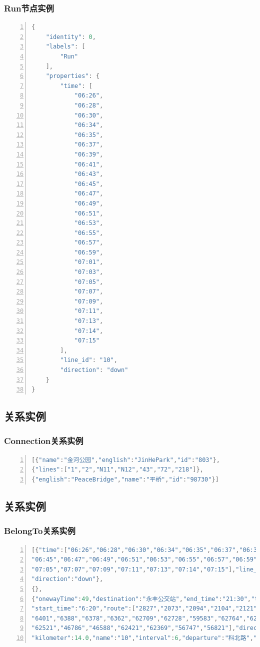 \documentclass[11pt,a4paper]{article}
\begin{document}
\subsubsection{Run节点实例}
\begin{lstlisting}[numbers = left, 
showspaces = false,
breaklines = true, 
language=Java]
{
	"identity": 0,
	"labels": [
		"Run"
	],
	"properties": {
		"time": [
			"06:26",
			"06:28",
			"06:30",
			"06:34",
			"06:35",
			"06:37",
			"06:39",
			"06:41",
			"06:43",
			"06:45",
			"06:47",
			"06:49",
			"06:51",
			"06:53",
			"06:55",
			"06:57",
			"06:59",
			"07:01",
			"07:03",
			"07:05",
			"07:07",
			"07:09",
			"07:11",
			"07:13",
			"07:14",
			"07:15"
		],
		"line_id": "10",
		"direction": "down"
	} 
}
\end{lstlisting} 

\subsection{关系实例}
\subsubsection{Connection关系实例}
\begin{lstlisting}[numbers = left, 
showspaces = false,
breaklines = true, 
language=Java]
[{"name":"金河公园","english":"JinHePark","id":"803"}, 
{"lines":["1","2","N11","N12","43","72","218"]}, 
{"english":"PeaceBridge","name":"平桥","id":"98730"}]
\end{lstlisting} 

\subsection{关系实例}
\subsubsection{BelongTo关系实例}
\begin{lstlisting}[numbers = left, 
showspaces = false,
breaklines = true, 
language=Java]
[{"time":["06:26","06:28","06:30","06:34","06:35","06:37","06:39","06:41","06:43",
"06:45","06:47","06:49","06:51","06:53","06:55","06:57","06:59","07:01","07:03",
"07:05","07:07","07:09","07:11","07:13","07:14","07:15"],"line_id":"10",
"direction":"down"},
{},
{"onewayTime":49,"destination":"永丰公交站","end_time":"21:30","type":"干线",
"start_time":"6:20","route":["2827","2073","2094","2104","2121","2229","3639","6408",
"6401","6388","6378","6362","62709","62728","59583","62764","62752","62778","62544",
"62521","46786","46588","62421","62369","56747","56821"],"directional":true,
"kilometer":14.0,"name":"10","interval":6,"departure":"科北路","direction":"down"}]
\end{lstlisting} 
 
\end{document}
